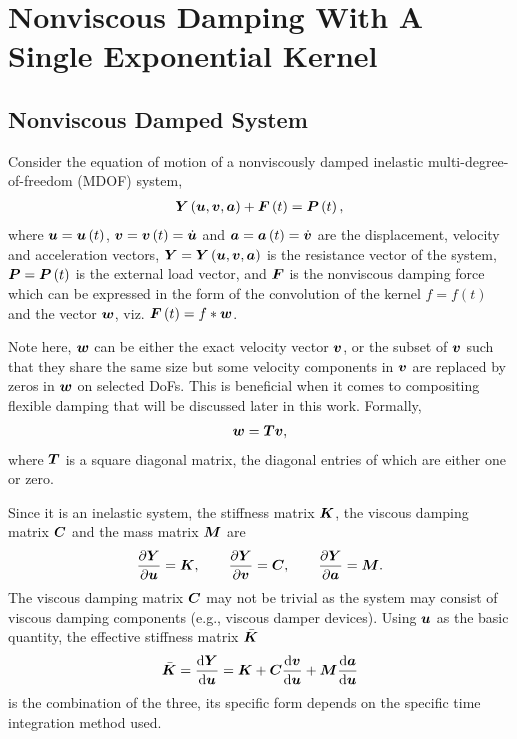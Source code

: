 \section{Nonviscous Damping With A Single Exponential Kernel}
\subsection{Nonviscous Damped System}
Consider the equation of motion of a nonviscously damped inelastic multi-degree-of-freedom (MDOF) system,
\begin{gather}\label{eq:eom}
\bm{Y}\left(\bm{u},\bm{v},\bm{a}\right)+\bm{F}\left(t\right)=\bm{P}\left(t\right),
\end{gather}
where $\bm{u}=\bm{u}\left(t\right)$, $\bm{v}=\bm{v}\left(t\right)=\dot{\bm{u}}$ and $\bm{a}=\bm{a}\left(t\right)=\dot{\bm{v}}$ are the displacement, velocity and acceleration vectors, $\bm{Y}=\bm{Y}\left(\bm{u},\bm{v},\bm{a}\right)$ is the resistance vector of the system, $\bm{P}=\bm{P}\left(t\right)$ is the external load vector, and $\bm{F}$ is the nonviscous damping force which can be expressed in the form of the convolution of the kernel $f=f\left(t\right)$ and the vector $\bm{w}$, viz. $\bm{F}\left(t\right)=f*\bm{w}$.

Note here, $\bm{w}$ can be either the exact velocity vector $\bm{v}$, or the subset of $\bm{v}$ such that they share the same size but some velocity components in $\bm{v}$ are replaced by zeros in $\bm{w}$ on selected DoFs. This is beneficial when it comes to compositing flexible damping that will be discussed later in this work. Formally,
\begin{gather}
\bm{w}=\bm{T}\bm{v},
\end{gather}
where $\bm{T}$ is a square diagonal matrix, the diagonal entries of which are either one or zero.

Since it is an inelastic system, the stiffness matrix $\bm{K}$, the viscous damping matrix $\bm{C}$ and the mass matrix $\bm{M}$ are
\begin{gather}
\dfrac{\partial{\bm{Y}}}{\partial{\bm{u}}}=\bm{K},\qquad
\dfrac{\partial{\bm{Y}}}{\partial{\bm{v}}}=\bm{C},\qquad
\dfrac{\partial{\bm{Y}}}{\partial{\bm{a}}}=\bm{M}.
\end{gather}
The viscous damping matrix $\bm{C}$ may not be trivial as the system may consist of viscous damping components (e.g., viscous damper devices). Using $\bm{u}$ as the basic quantity, the effective stiffness matrix $\bar{\bm{K}}$
\begin{gather}
\bar{\bm{K}}=\dfrac{\mathrm{d}\bm{Y}}{\mathrm{d}\bm{u}}=\bm{K}+\bm{C}\dfrac{\mathrm{d}\bm{v}}{\mathrm{d}\bm{u}}+\bm{M}\dfrac{\mathrm{d}\bm{a}}{\mathrm{d}\bm{u}}
\end{gather}
is the combination of the three, its specific form depends on the specific time integration method used.
